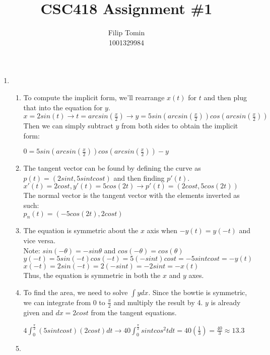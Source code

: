 \documentclass[12pt]{article}
\title{CSC418 Assignment \#1\\}
\author{Filip Tomin\\
\normalsize{1001329984}}
\date{}
\begin{document}
\maketitle
\begin{enumerate}
\item
\begin{enumerate}
\item %
To compute the implicit form, we'll rearrange $x(t)$ for $t$ and then plug that into the equation for $y$.\\
$x = 2sin(t)\rightarrow t = arcsin(\frac{x}{2})\rightarrow y = 5sin(arcsin(\frac{x}{2}))cos(arcsin(\frac{x}{2}))$\\
Then we can simply subtract $y$ from both sides to obtain the implicit form:\begin{center}
$0 = 5sin(arcsin(\frac{x}{2}))cos(arcsin(\frac{x}{2})) - y$
\end{center}
\item %
The tangent vector can be found by defining the curve as $p(t) = (2sint, 5sintcost)$ and then finding $p'(t)$.\\
$x'(t) = 2cost, y'(t) = 5cos(2t) \rightarrow p'(t) = (2cost, 5cos(2t))$\\
The normal vector is the tangent vector with the elements inverted as such:\\
$p_n(t) = (-5cos(2t), 2cost)$
\item %
The equation is symmetric about the $x$ axis when $-y(t) = y(-t)$ and vice versa.\\
Note: $sin(-\theta ) = -sin\theta$ and $cos(-\theta ) = cos(\theta )$\\
$y(-t) = 5sin(-t)cos(-t) = 5(-sint)cost = -5sintcost = -y(t)$\\
$x(-t) = 2sin(-t) = 2(-sint) = -2sint = -x(t)$\\
Thus, the equation is symmetric in both the $x$ and $y$ axes.
\item %
To find the area, we need to solve $\int ydx$. Since the bowtie is symmetric, we can integrate from 0 to $\frac{\pi}{2}$ and multiply the result by 4. $y$ is already given and $dx = 2cost$ from the tangent equations.\begin{center}
$4\int_0^\frac{\pi}{2} (5sintcost)(2cost)dt \rightarrow 40\int_0^\frac{\pi}{2} sintcos^2tdt = 40(\frac{1}{3}) = \frac{40}{3}\approx 13.3$
\end{center}
\item %

\end{enumerate}
\end{enumerate}
\end{document}
